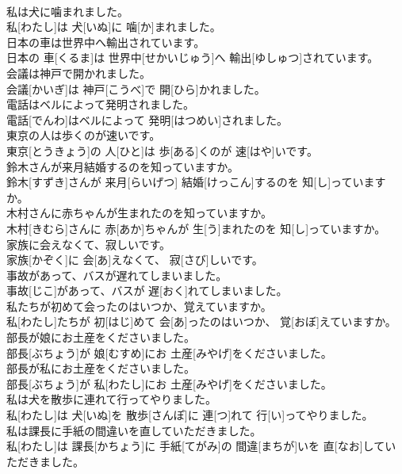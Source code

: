 \documentclass[8pt]{extreport}
\begin{document}
\begin{CJK}{UTF8}{min}
\\	私は犬に噛まれました。	
\\	私[わたし]は 犬[いぬ]に 噛[か]まれました。	
\\	日本の車は世界中へ輸出されています。	
\\	日本の 車[くるま]は 世界中[せかいじゅう]へ 輸出[ゆしゅつ]されています。	
\\	会議は神戸で開かれました。	
\\	会議[かいぎ]は 神戸[こうべ]で 開[ひら]かれました。	
\\	電話はベルによって発明されました。	
\\	電話[でんわ]はベルによって 発明[はつめい]されました。	
\\	東京の人は歩くのが速いです。	
\\	東京[とうきょう]の 人[ひと]は 歩[ある]くのが 速[はや]いです。	
\\	鈴木さんが来月結婚するのを知っていますか。	
\\	鈴木[すずき]さんが 来月[らいげつ] 結婚[けっこん]するのを 知[し]っていますか。	
\\	木村さんに赤ちゃんが生まれたのを知っていますか。	
\\	木村[きむら]さんに 赤[あか]ちゃんが 生[う]まれたのを 知[し]っていますか。	
\\	家族に会えなくて、寂しいです。	
\\	家族[かぞく]に 会[あ]えなくて、 寂[さび]しいです。	
\\	事故があって、バスが遅れてしまいました。	
\\	事故[じこ]があって、バスが 遅[おく]れてしまいました。	
\\	私たちが初めて会ったのはいつか、覚えていますか。	
\\	私[わたし]たちが 初[はじ]めて 会[あ]ったのはいつか、 覚[おぼ]えていますか。	
\\	部長が娘にお土産をくださいました。	
\\	部長[ぶちょう]が 娘[むすめ]にお 土産[みやげ]をくださいました。	
\\	部長が私にお土産をくださいました。	
\\	部長[ぶちょう]が 私[わたし]にお 土産[みやげ]をくださいました。	
\\	私は犬を散歩に連れて行ってやりました。	
\\	私[わたし]は 犬[いぬ]を 散歩[さんぽ]に 連[つ]れて 行[い]ってやりました。	
\\	私は課長に手紙の間違いを直していただきました。	
\\	私[わたし]は 課長[かちょう]に 手紙[てがみ]の 間違[まちが]いを 直[なお]していただきました。	

\end{CJK}
\end{document}
